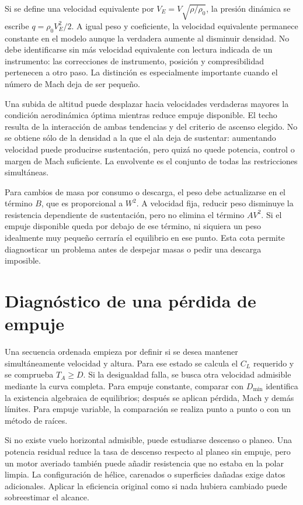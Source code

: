 Si se define una velocidad equivalente por $V_E=V\sqrt{\rho/\rho_0}$, la presión dinámica se escribe $q=\rho_0V_E^2/2$. A igual peso y coeficiente, la velocidad equivalente permanece constante en el modelo aunque la verdadera aumente al disminuir densidad. No debe identificarse sin más velocidad equivalente con lectura indicada de un instrumento: las correcciones de instrumento, posición y compresibilidad pertenecen a otro paso. La distinción es especialmente importante cuando el número de Mach deja de ser pequeño.

Una subida de altitud puede desplazar hacia velocidades verdaderas mayores la condición aerodinámica óptima mientras reduce empuje disponible. El techo resulta de la interacción de ambas tendencias y del criterio de ascenso elegido. No se obtiene sólo de la densidad a la que el ala deja de sustentar: aumentando velocidad puede producirse sustentación, pero quizá no quede potencia, control o margen de Mach suficiente. La envolvente es el conjunto de todas las restricciones simultáneas.

Para cambios de masa por consumo o descarga, el peso debe actualizarse en el término $B$, que es proporcional a $W^2$. A velocidad fija, reducir peso disminuye la resistencia dependiente de sustentación, pero no elimina el término $AV^2$. Si el empuje disponible queda por debajo de ese término, ni siquiera un peso idealmente muy pequeño cerraría el equilibrio en ese punto. Esta cota permite diagnosticar un problema antes de despejar masas o pedir una descarga imposible.

\section{Diagnóstico de una pérdida de empuje}
Una secuencia ordenada empieza por definir si se desea mantener simultáneamente velocidad y altura. Para ese estado se calcula el $C_L$ requerido y se comprueba $T_A\geq D$. Si la desigualdad falla, se busca otra velocidad admisible mediante la curva completa. Para empuje constante, comparar con $D_{\min}$ identifica la existencia algebraica de equilibrios; después se aplican pérdida, Mach y demás límites. Para empuje variable, la comparación se realiza punto a punto o con un método de raíces.

Si no existe vuelo horizontal admisible, puede estudiarse descenso o planeo. Una potencia residual reduce la tasa de descenso respecto al planeo sin empuje, pero un motor averiado también puede añadir resistencia que no estaba en la polar limpia. La configuración de hélice, carenados o superficies dañadas exige datos adicionales. Aplicar la eficiencia original como si nada hubiera cambiado puede sobreestimar el alcance.

